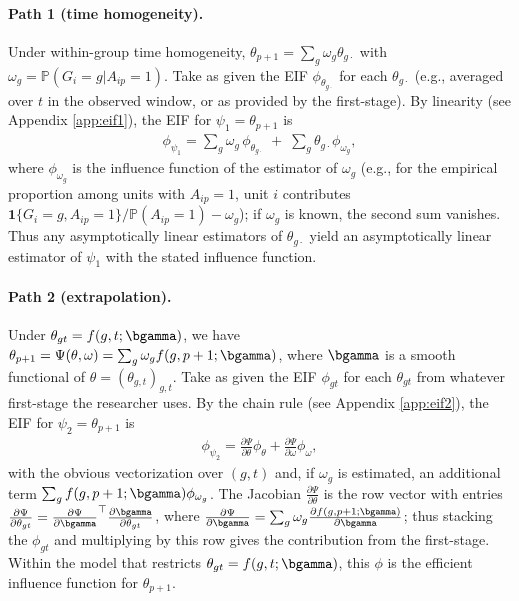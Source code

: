 \documentclass{article}
\renewcommand{\P}{\mathbb{P}}
\begin{document}
\paragraph{Path 1 (time homogeneity).} Under within-group time homogeneity, $\theta_{p+1} = \sum_g \omega_g \theta_{g\cdot}$ with $\omega_g = \P(G_i = g | A_{ip} = 1)$. Take as given the EIF $\phi_{\theta_{g\cdot}}$ for each $\theta_{g\cdot}$ (e.g., averaged over $t$ in the observed window, or as provided by the first-stage). By linearity (see Appendix \ref{app:eif1}), the EIF for $\psi_1 = \theta_{p+1}$ is
\begin{align*}
    \phi_{\psi_1} = \sum_g \omega_g \, \phi_{\theta_{g\cdot}} \; + \; \sum_g \theta_{g\cdot} \phi_{\omega_g},
\end{align*}
where $\phi_{\omega_g}$ is the influence function of the estimator of $\omega_g$ (e.g., for the empirical proportion among units with $A_{ip}=1$, unit $i$ contributes $\mathbf{1}\{G_i=g, A_{ip}=1\}/\P(A_{ip}=1) - \omega_g$); if $\omega_g$ is known, the second sum vanishes. Thus any asymptotically linear estimators of $\theta_{g\cdot}$ yield an asymptotically linear estimator of $\psi_1$ with the stated influence function.

\paragraph{Path 2 (extrapolation).} Under $\theta_{gt} = f(g,t;\bgamma)$, we have $\theta_{p+1} = \Psi(\theta, \omega) = \sum_g \omega_g f(g, p+1; \bgamma)$, where $\bgamma$ is a smooth functional of $\theta = (\theta_{g,t})_{g,t}$. Take as given the EIF $\phi_{gt}$ for each $\theta_{gt}$ from whatever first-stage the researcher uses. By the chain rule (see Appendix \ref{app:eif2}), the EIF for $\psi_2 = \theta_{p+1}$ is
\begin{align*}
    \phi_{\psi_2} = \frac{\partial \Psi}{\partial \theta} \phi_{\theta} + \frac{\partial \Psi}{\partial \omega} \phi_{\omega},
\end{align*}
with the obvious vectorization over $(g,t)$ and, if $\omega_g$ is estimated, an additional term $\sum_g f(g,p+1;\bgamma) \phi_{\omega_g}$. The Jacobian $\frac{\partial \Psi}{\partial \theta}$ is the row vector with entries $\frac{\partial \Psi}{\partial \theta_{gt}} = \frac{\partial \Psi}{\partial \bgamma}^\top \frac{\partial \bgamma}{\partial \theta_{gt}}$, where $\frac{\partial \Psi}{\partial \bgamma} = \sum_g \omega_g \frac{\partial f(g,p+1;\bgamma)}{\partial \bgamma}$; thus stacking the $\phi_{gt}$ and multiplying by this row gives the contribution from the first-stage. Within the model that restricts $\theta_{gt} = f(g,t;\bgamma)$, this $\phi$ is the efficient influence function for $\theta_{p+1}$.
\end{document}

